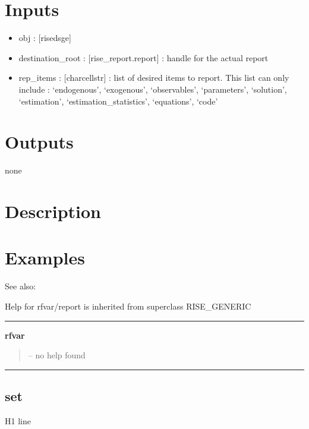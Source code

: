 \documentclass[letterpaper,10pt,english]{sphinxmanual}
\begin{document}
\section{Inputs}
\label{classes/models/@rfvar/rfvar:id103}\begin{itemize}
\item {} 
obj : {[}rise\textbar{}dsge{]}

\item {} 
destination\_root : {[}rise\_report.report{]} : handle for the actual report

\item {} 
rep\_items : {[}char\textbar{}cellstr{]} : list of desired items to report. This list
can only include : `endogenous', `exogenous', `observables',
`parameters', `solution', `estimation', `estimation\_statistics',
`equations', `code'

\end{itemize}


\section{Outputs}
\label{classes/models/@rfvar/rfvar:id104}
none


\section{Description}
\label{classes/models/@rfvar/rfvar:id105}

\section{Examples}
\label{classes/models/@rfvar/rfvar:id106}
See also:

Help for rfvar/report is inherited from superclass RISE\_GENERIC


\bigskip\hrule{}\bigskip

\label{classes/models/@rfvar/rfvar:rfvar}
\textbf{rfvar}
\begin{quote}

-- no help found
\end{quote}


\bigskip\hrule{}\bigskip



\subsection{set}
\label{classes/models/@rfvar/rfvar:set}\label{classes/models/@rfvar/rfvar:id107}
H1 line
\end{document}
